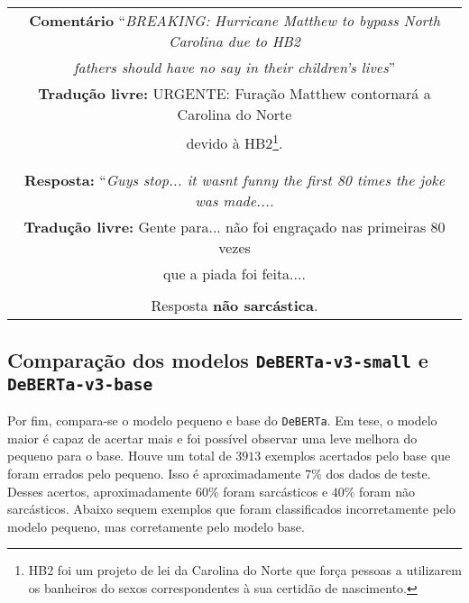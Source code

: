 \begin{center}
\begin{tabular}{|c|}

\hline

\textbf{Comentário} ``\textit{BREAKING: Hurricane Matthew to bypass North Carolina due to HB2} \\
\textit{fathers should have no say in their children's lives}'' \\

\textbf{Tradução livre:} URGENTE: Furação Matthew contornará a Carolina do Norte \\
devido à HB2\footnote{HB2 foi um projeto de lei da Carolina do Norte que força
pessoas a utilizarem os banheiros do sexos correspondentes à sua certidão de
nascimento.}. \\ \\

\hline

\\

\textbf{Resposta:} ``\textit{Guys stop... it wasnt funny the first 80 times the
joke was made....} \\

\textbf{Tradução livre:} Gente para... não foi engraçado nas primeiras 80 vezes
\\
que a piada foi feita.... \\ \\

Resposta \textbf{não sarcástica}.

\\ \hline

\end{tabular}
\end{center}

\subsection{Comparação dos modelos \texttt{DeBERTa-v3-small} e
\texttt{DeBERTa-v3-base}}%
\label{sub:comparacao_dos_modelos_deberta-v3-small_e-deberta-v3-base}

Por fim, compara-se o modelo pequeno e base do \texttt{DeBERTa}. Em tese, o
modelo maior é capaz de acertar mais e foi possível observar uma leve melhora do
pequeno para o base. Houve um total de $3913$ exemplos acertados pelo base que
foram errados pelo pequeno. Isso é aproximadamente $7\%$ dos dados de teste.
Desses acertos, aproximadamente $60\%$ foram sarcásticos e $40\%$ foram não
sarcásticos. Abaixo sequem exemplos que foram classificados incorretamente pelo
modelo pequeno, mas corretamente pelo modelo base.

